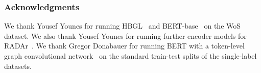 \documentclass[acmsmall,nonacm]{acmart}
\begin{document}
\subsubsection*{Acknowledgments}
We thank Yousef Younes for running HBGL~\cite{hbgl} and BERT-base~\cite{DBLP:conf/naacl/DevlinCLT19} on the WoS dataset.
We also thank Yousef Younes for running further encoder models for RADAr~\cite{radar}.
We thank Gregor Donabauer for running BERT with a token-level graph convolutional network~\cite{donabauer2024tokenlevelgraphsshorttext} on the standard train-test splits of the single-label datasets.




%


\end{document}
